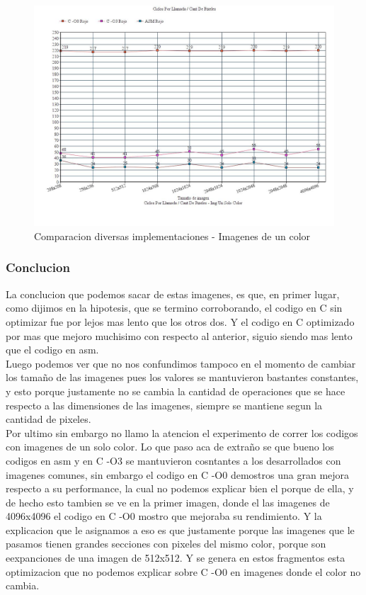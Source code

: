 \begin{figure}[h!]
\centering
\captionsetup{justification=centering}
	\includegraphics[width = 15 cm, height = 8 cm]{imagenes/mismoColor.jpg}
	\caption[center]{Comparacion diversas implementaciones - Imagenes de un color}
\end{figure}


\subsubsection{Conclucion}
La conclucion que podemos sacar de estas imagenes, es que, en primer lugar, como dijimos en la hipotesis, que se termino corroborando, el codigo en C sin optimizar fue por lejos mas lento que los otros dos. Y el codigo en C optimizado por mas que mejoro muchisimo con respecto al anterior, siguio siendo mas lento que el codigo en asm. \\ Luego podemos ver que no nos confundimos tampoco en el momento de cambiar los tamaño de las imagenes pues los valores se mantuvieron bastantes constantes, y esto porque justamente no se cambia la cantidad de operaciones que se hace respecto a las dimensiones de las imagenes, siempre se mantiene segun la cantidad de pixeles. \\ Por ultimo sin embargo no llamo la atencion el experimento de correr los codigos con imagenes de un solo color. Lo que paso aca de extraño se que bueno los codigos en asm y en C -O3 se mantuvieron cosntantes a los desarrollados con imagenes comunes, sin embargo el codigo en C -O0 demostros una gran mejora respecto a su performance, la cual no podemos explicar bien el porque de ella, y de hecho esto tambien se ve en la primer imagen, donde el las imagenes de 4096x4096 el codigo en C -O0 mostro que mejoraba su rendimiento. Y la explicacion que le asignamos a eso es que justamente porque las imagenes que le pasamos tienen grandes secciones con pixeles del mismo color, porque son eexpanciones de una imagen de 512x512. Y se genera en estos fragmentos esta optimizacion que no podemos explicar sobre C -O0 en imagenes donde el color no cambia.

